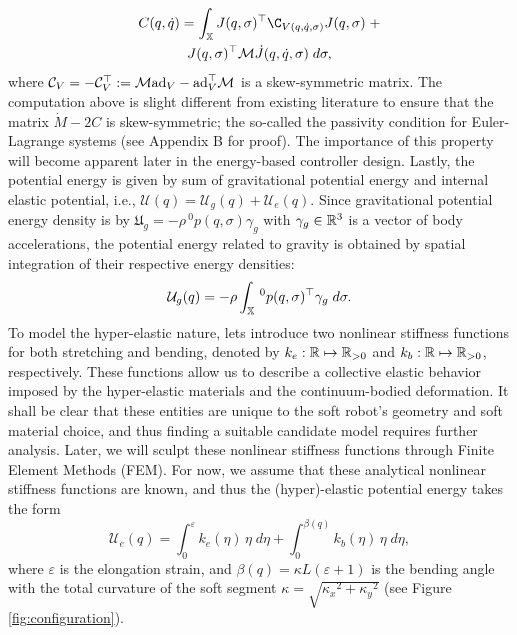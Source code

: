 {%
\begin{multline}
C(q,\dot{q}) = \int_\Xs J(q,\sigma)^\top \C_{V(q,\dot{q},\sigma)}J(q,\sigma)\; + \\ J(q,\sigma)^\top \M \dot{J}(q,\dot{q},\sigma) \; d \sigma,\label{eq:coriolis}
\end{multline}
%
where $\mathcal{C}_{V} = -\mathcal{C}_{V}^\top :=  \mathcal{M} \text{ad}_{V}  - \text{ad}_{V} ^\top \mathcal{M}$ is a skew-symmetric matrix. The computation above is slight different from existing literature\cite{Boyer2021,Renda2020} to ensure that the matrix $\dot{M} - 2C$ is skew-symmetric; the so-called the passivity condition\cite{Murray1994} for Euler-Lagrange systems (see Appendix B for proof). The importance of this property will become apparent later in the energy-based controller design. Lastly, the potential energy is given by sum of gravitational potential energy and internal elastic potential, i.e., $\mathcal{U}({q}) = \mathcal{U}_g({q}) + \mathcal{U}_e({q})
$. Since gravitational potential energy density is  by $\mathfrak{U}_g = -\rho\,^0p(q,\sigma) \gamma_g$ with $\gamma_g \in \mathbb{R}^3$ is a vector of body accelerations, the potential energy related to gravity is obtained by spatial integration of their respective energy densities:
%
\begin{equation}
\mathcal{U}_g({q}) = - \rho \int_\Xs \,^0p(q,\sigma)^\top \gamma_g \; d \sigma.
\label{eq:potential_energy_grav}
\end{equation}
%
\noindent To model the hyper-elastic nature, lets introduce two nonlinear stiffness functions for both stretching and bending, denoted by $k_e: \mathbb{R} \mapsto \mathbb{R}_{>0}$ and $k_b: \mathbb{R} \mapsto \mathbb{R}_{>0}$, respectively. These functions allow us to describe a collective elastic behavior imposed by the hyper-elastic materials and the continuum-bodied deformation. It shall be clear that these entities are unique to the soft robot's geometry and soft material choice, and thus finding a suitable candidate model requires further analysis. Later, we will sculpt these nonlinear stiffness functions through Finite Element Methods (FEM). For now, we assume that these analytical nonlinear stiffness functions are known, and thus the (hyper)-elastic potential energy takes the form
%
\begin{equation}
\mathcal{U}_e({q}) = \int_0^{\varepsilon} k_e(\eta) \,\eta \; d \eta + \int_0^{\beta(q)} k_b(\eta)\, \eta \; d \eta,
\label{eq:potential_energy_elas}
\end{equation}
%
where $\varepsilon$ is the elongation strain, and $\beta({q}) = \kappa L (\varepsilon + 1)$ is the bending angle with the total curvature of the soft segment $\kappa = \sqrt{{\kappa_x}^2 + {\kappa_y}^2}$ (see Figure \ref{fig:configuration}).
}

